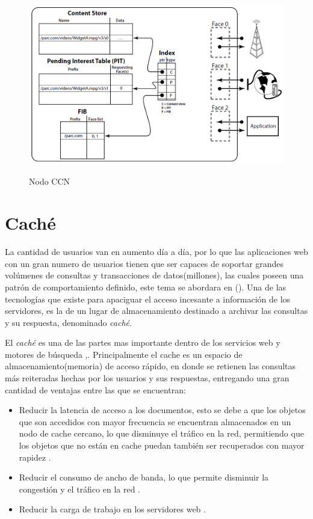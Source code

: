 \documentclass[12pt]{ociamthesis}  %
\begin{document}
	\begin{figure}[h]
		\centering
		\includegraphics[width=12cm]{Nodo.png}\\
		\caption{Nodo CCN}
		\label{fig:mesh1}
	\end{figure}
	


\section{Caché}
La cantidad de usuarios van en aumento día a día, por lo que las aplicaciones web con un gran numero de usuarios tienen que ser capaces de soportar grandes volúmenes de consultas y transacciones de datos(millones), las cuales poseen una patrón de comportamiento definido, este tema se abordara en (). Una de las tecnologías que existe para apaciguar el acceso incesante a información de los servidores, es la de un lugar de almacenamiento destinado a archivar las consultas y su respuesta, denominado \textit{caché}.

El \textit{caché} es una de las partes mas importante dentro de los servicios web y motores de búsqueda \cite{altingovde2009cost},\cite{aggarwal1999caching}. Principalmente el cache es un espacio de almacenamiento(memoria) de acceso rápido, en donde se retienen las consultas más reiteradas hechas por los usuarios y sus respuestas, entregando una gran cantidad de ventajas entre las que se encuentran:

\begin{itemize}
	
	\item Reducir la latencia de acceso a los documentos, esto se debe a que los objetos que son accedidos con mayor frecuencia se encuentran almacenados en un nodo de cache cercano, lo que disminuye el tráfico en la red, permitiendo que los objetos que no están en cache puedan también ser recuperados con mayor rapidez \cite{wang1999survey}.
	
	\item Reducir el consumo de ancho de banda, lo que permite disminuir la congestión y el tráfico en la red \cite{wang1999survey}.
	
	\item Reducir la carga de trabajo en los servidores web \cite{wang1999survey}.
	
\end{itemize}
\end{document}
